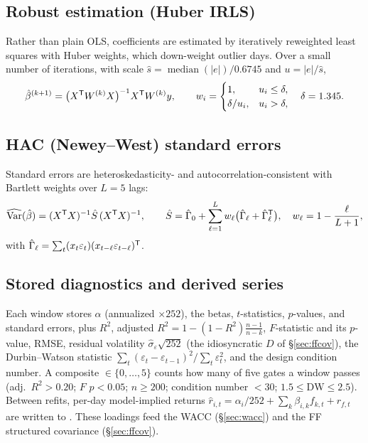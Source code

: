 \documentclass[11pt]{article}
\begin{document}
\subsection{Robust estimation (Huber IRLS)}
Rather than plain OLS, coefficients are estimated by iteratively reweighted least
squares with Huber weights, which down-weight outlier days. Over a small number of
iterations, with scale $\hat s=\operatorname{median}(|e|)/0.6745$ and
$u=|e|/\hat s$,
\begin{equation}
  \hat\beta^{(k+1)}=\big(X^{\mathsf{T}} W^{(k)}X\big)^{-1}X^{\mathsf{T}} W^{(k)}y,\qquad
  w_i=\begin{cases}1,& u_i\le\delta,\\ \delta/u_i,& u_i>\delta,\end{cases}
  \quad \delta=1.345 .
\end{equation}

\subsection{HAC (Newey--West) standard errors}
Standard errors are heteroskedasticity- and autocorrelation-consistent with
Bartlett weights over $L=5$ lags:
\begin{equation}
  \widehat{\operatorname{Var}}(\hat\beta)=(X^{\mathsf{T}} X)^{-1}\hat S\,(X^{\mathsf{T}} X)^{-1},\qquad
  \hat S=\hat\Gamma_0+\sum_{\ell=1}^{L}w_\ell\big(\hat\Gamma_\ell+\hat\Gamma_\ell^{\mathsf{T}}\big),\quad
  w_\ell=1-\frac{\ell}{L+1},
\end{equation}
with $\hat\Gamma_\ell=\sum_t (x_t\varepsilon_t)(x_{t-\ell}\varepsilon_{t-\ell})^{\mathsf{T}}$.

\subsection{Stored diagnostics and derived series}
Each window stores $\alpha$ (annualized $\times252$), the betas, $t$-statistics,
$p$-values, and standard errors, plus $R^2$, adjusted
$R^2=1-(1-R^2)\tfrac{n-1}{n-k}$, $F$-statistic and its $p$-value, RMSE, residual
volatility $\hat\sigma_\varepsilon\sqrt{252}$ (the idiosyncratic $D$ of
\S\ref{sec:ffcov}), the Durbin--Watson statistic
$\sum_t(\varepsilon_t-\varepsilon_{t-1})^2/\sum_t\varepsilon_t^2$, and the design
condition number. A composite $\in\{0,\dots,5\}$ counts how
many of five gates a window passes (adj.\ $R^2>0.20$; $F$ $p<0.05$; $n\ge200$;
condition number $<30$; $1.5\le \mathrm{DW}\le2.5$). Between refits, per-day
model-implied returns $\hat r_{i,t}=\alpha_i/252+\sum_k\beta_{i,k}f_{k,t}+r_{f,t}$
are written to . These loadings feed the WACC
(\S\ref{sec:wacc}) and the FF structured covariance (\S\ref{sec:ffcov}).
\end{document}
